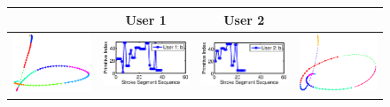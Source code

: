 \begin{figure}[!bhp]
\vspace{-0mm}
\centering
\begin{tabular}{|cc|cc|}
\hline
      & User 1 & User 2 &
\\ \hline %

{\includegraphics[width=.3\columnwidth]{./Graphic/Pic_words_forSystemSection/user_2_bphmn_2_at_3th_component.eps}}
&{\includegraphics[width=.55\columnwidth]{./Graphic/Pic_words_forSystemSection/user1_b.eps}}  
&{\includegraphics[width=.55\columnwidth]{./Graphic/Pic_words_forSystemSection/user2_b.eps}} &{\includegraphics[width=.3\columnwidth]{./Graphic/Pic_words_forSystemSection/user_1_bphmn_2_at_5th_component.eps}} 

\\ \hline %


\end{tabular}
\end{figure}
